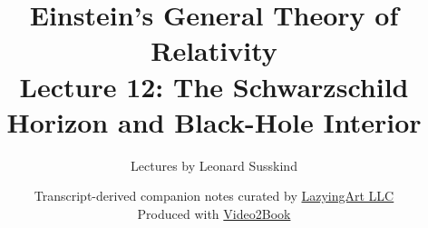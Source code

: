 \documentclass[11pt,oneside]{book}
\begin{document}
\frontmatter
\hypersetup{pageanchor=false}
\title{Einstein's General Theory of Relativity\\[0.45em]
\large Lecture 12: The Schwarzschild Horizon and Black-Hole Interior}
\author{Lectures by Leonard Susskind}
\date{Transcript-derived companion notes curated by
\href{https://lazying.art}{LazyingArt LLC}\\[0.35em]
\small Produced with
\href{https://github.com/lachlanchen/Video2Book}{Video2Book}}
\maketitle
\hypersetup{pageanchor=true}
\clearpage
\mainmatter

\end{document}
